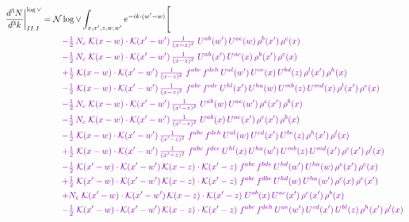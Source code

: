 \documentclass[10pt]{article}
\numberwithin{equation}{section}
\newcommand{\NNv}{\mathcal N\log\vee}
\begin{document}
\begin{align}
\frac{d^3N}{d^3k}\bigg|^{\log\vee}_{II.I}={}&\NNv\int_{x,x',z,w,w'}e^{-ik\cdot(w'-w)}\Bigg[\notag\\
&\quad{\color{CC}-\tfrac{1}{2}\,N_c\;\mathcal{K}(x-w)\cdot\mathcal{K}(x'-w')\,\tfrac{1}{(x-z)^{2}}\;U^{ab}(w')\,U^{ac}(w)\,\rho^{b}(x')\,\rho^{c}(x)}\notag\\
&\quad{\color{CC}-\tfrac{1}{2}\,N_c\;\mathcal{K}(x-w)\cdot\mathcal{K}(x'-w')\,\tfrac{1}{(x-z)^{2}}\;U^{ab}(x')\,U^{ac}(x)\,\rho^{b}(x')\,\rho^{c}(x)}\notag\\
&\quad{\color{CC}+\tfrac{1}{2}\;\mathcal{K}(x-w)\cdot\mathcal{K}(x'-w')\,\tfrac{1}{(x-z)^{2}}\;f^{abc}\,f^{deh}\,U^{al}(w')\,U^{ce}(x)\,U^{bd}(z)\,\rho^{l}(x')\,\rho^{h}(x)}\notag\\
&\quad{\color{CC}-\tfrac{1}{2}\;\mathcal{K}(x-w)\cdot\mathcal{K}(x'-w')\,\tfrac{1}{(x-z)^{2}}\;f^{abc}\,f^{cde}\,U^{hl}(x')\,U^{ha}(w)\,U^{mb}(z)\,U^{md}(x)\,\rho^{l}(x')\,\rho^{e}(x)}\notag\\
&\quad{\color{CC}-\tfrac{1}{2}\,N_c\;\mathcal{K}(x-w)\cdot\mathcal{K}(x'-w')\,\tfrac{1}{(x'-z)^{2}}\;U^{ab}(w)\,U^{ac}(w')\,\rho^{c}(x')\,\rho^{b}(x)}\notag\\
&\quad{\color{CC}-\tfrac{1}{2}\,N_c\;\mathcal{K}(x-w)\cdot\mathcal{K}(x'-w')\,\tfrac{1}{(x'-z)^{2}}\;U^{ab}(x)\,U^{ac}(x')\,\rho^{c}(x')\,\rho^{b}(x)}\notag\\
&\quad{\color{CC}-\tfrac{1}{2}\;\mathcal{K}(x-w)\cdot\mathcal{K}(x'-w')\,\tfrac{1}{(x'-z)^{2}}\;f^{abc}\,f^{deh}\,U^{al}(w)\,U^{cd}(x')\,U^{be}(z)\,\rho^{h}(x')\,\rho^{l}(x)}\notag\\
&\quad{\color{CC}+\tfrac{1}{2}\;\mathcal{K}(x-w)\cdot\mathcal{K}(x'-w')\,\tfrac{1}{(x'-z)^{2}}\;f^{abc}\,f^{dce}\,U^{hl}(x)\,U^{ha}(w')\,U^{mb}(z)\,U^{md}(x')\,\rho^{e}(x')\,\rho^{l}(x)}\notag\\
&\quad{\color{CC}-\tfrac{1}{2}\;\mathcal{K}(x'-w)\cdot\mathcal{K}(x'-w')\,\mathcal{K}(x-z)\cdot\mathcal{K}(x'-z)\;f^{abc}\,f^{bde}\,U^{hd}(w')\,U^{ha}(w)\,\rho^{e}(x')\,\rho^{c}(x)}\notag\\
&\quad{\color{CC}+\tfrac{1}{2}\;\mathcal{K}(x'-w)\cdot\mathcal{K}(x'-w')\,\mathcal{K}(x-z)\cdot\mathcal{K}(x'-z)\;f^{abc}\,f^{dbe}\,U^{hd}(w)\,U^{ha}(w')\,\rho^{c}(x)\,\rho^{e}(x')}\notag\\
&\quad{\color{CC}+N_c\;\mathcal{K}(x'-w)\cdot\mathcal{K}(x'-w')\,\mathcal{K}(x-z)\cdot\mathcal{K}(x'-z)\;U^{ab}(x)\,U^{ac}(x')\,\rho^{c}(x')\,\rho^{b}(x)}\notag\\
&\quad{\color{CC}-\tfrac{1}{2}\;\mathcal{K}(x'-w)\cdot\mathcal{K}(x'-w')\,\mathcal{K}(x-z)\cdot\mathcal{K}(x'-z)\;f^{abc}\,f^{deh}\,U^{ae}(w')\,U^{cd}(x')\,U^{bl}(z)\,\rho^{h}(x')\,\rho^{l}(x)}\notag\\

\end{align}
\end{document}
